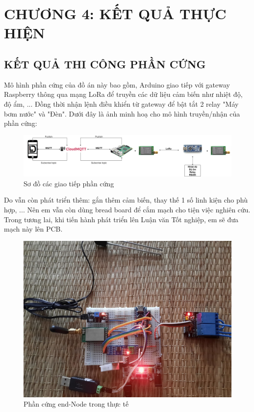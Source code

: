 \section*{CHƯƠNG 4: KẾT QUẢ THỰC HIỆN}
\setcounter{section}{4}
\setcounter{figure}{0}
\setcounter{subsection}{0}
\subsection{KẾT QUẢ THI CÔNG PHẦN CỨNG}
Mô hình phần cứng của đồ án này bao gồm, Arduino giao tiếp với gateway Raspberry thông qua mạng LoRa để truyền các dữ liệu cảm biến như nhiệt độ, độ ẩm, ... Đồng thời nhận lệnh điều khiển từ gateway để bật tắt 2 relay "Máy bơm nước" và "Đèn". Dưới đây là ảnh minh hoạ cho mô hình truyền/nhận của phần cứng:
\begin{figure}[H]
	\centering
	\includegraphics[scale=0.2]{Chapter 4/image chapter 4/figure.png}
	\caption[Sơ đồ các giao tiếp phần cứng]{Sơ đồ các giao tiếp phần cứng}
	\label{hinh41}
\end{figure}
\indent Do vẫn còn phát triển thêm: gắn thêm cảm biến, thay thế 1 số linh kiện cho phù hợp, ... Nên em vẫn còn dùng bread board để cắm mạch cho tiện việc nghiên cứu. Trong tương lai, khi tiến hành phát triển lên Luận văn Tốt nghiệp, em sẽ đưa mạch này lên PCB.
\begin{figure}[H]
	\centering
	\includegraphics[scale=0.2]{Chapter 4/image chapter 4/phancung.jpg}
	\caption[Phần cứng end-Node trong thực tế]{Phần cứng end-Node trong thực tế}
	\label{hinh42}
\end{figure}
